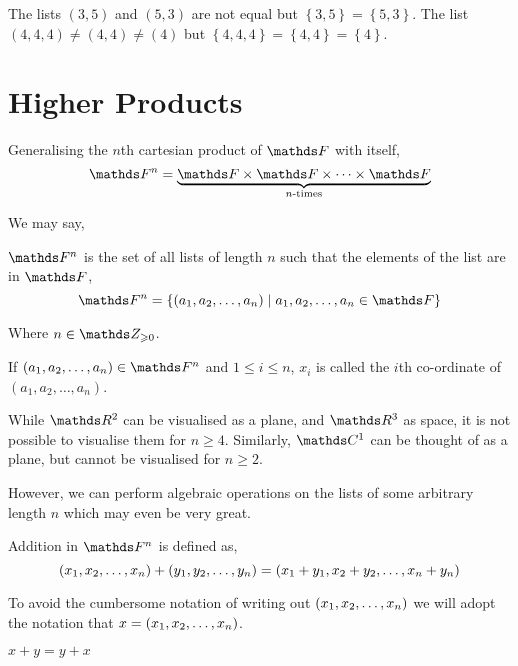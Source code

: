 \begin{example}
    The lists \((3,5)\) and \((5,3)\) are not equal but \(\left\{3,5\right\} = \left\{5,3\right\}\). 
    The list \((4,4,4) \ne (4,4) \ne (4)\) but \(\left\{4,4,4\right\} = \left\{4,4\right\} = \left\{4\right\}\).
\end{example}

\section{Higher Products}

Generalising the \(n\)th cartesian product of \(\FF\) with itself, 
\[
    \FF^n = \underbrace{\FF \times \FF \times \dots \times \FF}_{n\textup{-times}}
\]


We may say,
\begin{definition}
    \(\FF^n\) is the set of all lists of length \(n\) such that the elements of the list are in \(\FF\),
    \[
        \FF^n = \left\{(a_1, a_2, \dots, a_n) \mid a_1, a_2, \dots, a_n \in \FF\right\}
    \]
\end{definition}

Where \(n \in \ZZO\).

\begin{definition}
    [Co-ordinate]
    If \((a_1, a_2, \dots, a_n) \in \FF^n\) and \(1 \le i \le n\), \(x_i\) is called the \(i\)th co-ordinate of
    \((a_1, a_2, \dots, a_n)\).  
\end{definition}

While \(\RR^2\) can be visualised as a plane, and \(\RR^3\) as space, it is not possible to visualise them
for \(n \ge 4\). Similarly, \(\CC^1\) can be thought of as a plane, but cannot be visualised for \(n \ge 2\).

However, we can perform algebraic operations on the lists of some arbitrary length \(n\) which may even be 
very great. 

\begin{definition}
    [Addition in \(\FF^n\)]
    \label{def: addition in fn}
    Addition in \(\FF^n\) is defined as,
    \[
        \left(x_{1}, x_{2}, \dots, x_{n}\right) + \left(y_{1}, y_{2}, \dots, y_{n}\right) = (x_1 + y_1, x_2 + y_2, \dots, x_n + y_n)
    \]
\end{definition}

To avoid the cumbersome notation of writing out \(\left(x_{1}, x_{2}, \dots, x_{n}\right)\) we will adopt the notation that \(x = \left(x_{1}, x_{2}, \dots, x_{n}\right)\).

\begin{proposition}
    \(x + y = y + x\)
\end{proposition}

